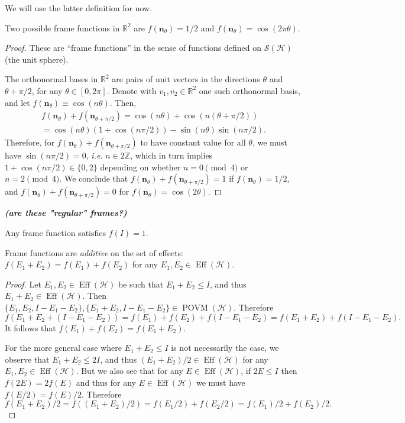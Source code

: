 \documentclass[12pt]{report}
\newcommand{\ZZ}{\mathbb{Z}}
\newcommand{\RR}{\mathbb{R}}
\newcommand{\on}[1]{\operatorname{#1}}
\newcommand{\bs}[1]{\boldsymbol{#1}}
\newcommand{\calH}{{\mathcal{H}}}
\newcommand{\calS}{{\mathcal{S}}}
\newcommand{\wondering}[1]{{\color{red}\itshape\bfseries (#1)}}
\begin{document}
We will use the latter definition for now.

\begin{example}
	Two possible frame functions in $\RR^2$ are $f(\bs n_\theta)=1/2$ and $f(\bs n_\theta)=\cos(2\pi \theta)$.
\end{example}
\begin{proof}
	These are ``frame functions'' in the sense of functions defined on $\calS(\calH)$ (the unit sphere).

	The orthonormal bases in $\RR^2$ are pairs of unit vectors in the directions $\theta$ and $\theta+\pi/2$, for any $\theta\in[0,2\pi]$.
	Denote with $v_1, v_2\in\RR^2$ one such orthonormal basis, and let $f(\bs n_\theta)\equiv \cos(n\theta)$. Then,
	\begin{equation}
	\begin{gathered}
		f(\bs n_\theta) + f(\bs n_{\theta+\pi/2})
		= \cos(n \theta) + \cos(n(\theta+\pi/2)) \\
		= \cos(n\theta)(1 + \cos(n\pi/2)) - \sin(n\theta) \sin(n\pi/2).
	\end{gathered}
	\end{equation}
	Therefore, for $f(\bs n_\theta) + f(\bs n_{\theta+\pi/2})$ to have constant value for all $\theta$, we must have $\sin(n\pi/2)=0$, \emph{i.e.} $n\in 2\ZZ$, which in turn implies $1+\cos(n\pi/2)\in\{0,2\}$ depending on whether $n=0\pmod 4$ or ${n=2\pmod 4}$.
	We conclude that $f(\bs n_\theta) + f(\bs n_{\theta+\pi/2})=1$ if $f(\bs n_\theta)=1/2$, and
	$f(\bs n_\theta) + f(\bs n_{\theta+\pi/2})=0$ for $f(\bs n_\theta)=\cos(2\theta)$.
\end{proof}
\wondering{are these "regular" frames?}

\begin{prop}
	Any frame function satisfies $f(I)=1$.
\end{prop}

\begin{prop}
	Frame functions are \emph{additive} on the set of effects:
	$f(E_1+E_2)=f(E_1)+f(E_2)$ for any $E_1,E_2\in\on{Eff}(\calH)$.
	\label{prop:frame_functions_are_additive}
\end{prop}
\begin{proof}
	Let $E_1,E_2\in\on{Eff}(\calH)$ be such that $E_1+E_2\le I$, and thus $E_1+E_2\in\on{Eff}(\calH)$.
	Then $\{E_1,E_2,I-E_1-E_2\},\{E_1+E_2,I-E_1-E_2\}\in\on{POVM}(\calH)$.
	Therefore
	\begin{equation}
		f(E_1 + E_2 + (I-E_1-E_2))
		= f(E_1) + f(E_2) + f(I-E_1-E_2)
		= f(E_1 + E_2) + f(I-E_1-E_2).
	\end{equation}
	It follows that $f(E_1)+f(E_2)=f(E_1+E_2)$.

	For the more general case where $E_1+E_2\le I$ is not necessarily the case, we observe that $E_1+E_2\le 2I$, and thus $(E_1+E_2)/2\in\on{Eff}(\calH)$ for any $E_1,E_2\in\on{Eff}(\calH)$.
	But we also see that for any $E\in\on{Eff}(\calH)$, if $2E\le I$ then $f(2E)=2f(E)$ and thus for any $E\in\on{Eff}(\calH)$ we must have $f(E/2)=f(E)/2$.
	Therefore
	\begin{equation}
		f(E_1+E_2)/2 = f((E_1+E_2)/2)
		= f(E_1/2) + f(E_2/2)
		= f(E_1)/2 + f(E_2)/2.
	\end{equation}
\end{proof}
\end{document}
